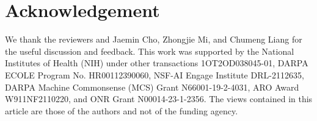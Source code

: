 \section*{Acknowledgement}
We thank the reviewers and Jaemin Cho, Zhongjie Mi, and Chumeng Liang for the useful discussion and feedback. This work was supported by the National Institutes of Health (NIH) under other transactions 1OT2OD038045-01, DARPA ECOLE Program No. HR00112390060, NSF-AI Engage Institute DRL-2112635, DARPA Machine Commonsense (MCS) Grant N66001-19-2-4031, ARO Award W911NF2110220, and ONR Grant N00014-23-1-2356. The views contained in this article are those of the authors and not of the funding agency. 